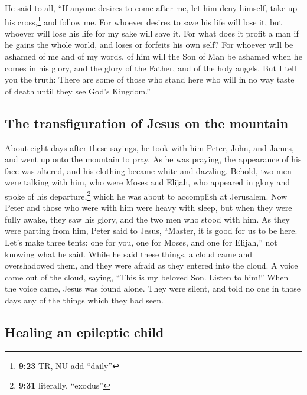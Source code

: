 He said to all, ``If anyone desires to come after me,
let him deny himself, take up his cross,\footnote{\textbf{9:23} TR, NU
  add ``daily''} and follow me.  For whoever desires to
save his life will lose it, but whoever will lose his life for my sake
will save it.  For what does it profit a man if he gains
the whole world, and loses or forfeits his own self?  For
whoever will be ashamed of me and of my words, of him will the Son of
Man be ashamed when he comes in his glory, and the glory of the Father,
and of the holy angels.  But I tell you the truth: There
are some of those who stand here who will in no way taste of death until
they see God's Kingdom.''

\hypertarget{the-transfiguration-of-jesus-on-the-mountain}{%
\subsection{The transfiguration of Jesus on the
mountain}\label{the-transfiguration-of-jesus-on-the-mountain}}

 About eight days after these sayings, he took with him
Peter, John, and James, and went up onto the mountain to pray.
 As he was praying, the appearance of his face was
altered, and his clothing became white and dazzling. 
Behold, two men were talking with him, who were Moses and Elijah,
 who appeared in glory and spoke of his
departure,\footnote{\textbf{9:31} literally, ``exodus''} which he was
about to accomplish at Jerusalem.  Now Peter and those
who were with him were heavy with sleep, but when they were fully awake,
they saw his glory, and the two men who stood with him. 
As they were parting from him, Peter said to Jesus, ``Master, it is good
for us to be here. Let's make three tents: one for you, one for Moses,
and one for Elijah,'' not knowing what he said.  While he
said these things, a cloud came and overshadowed them, and they were
afraid as they entered into the cloud.  A voice came out
of the cloud, saying, ``This is my beloved Son. Listen to him!''
 When the voice came, Jesus was found alone. They were
silent, and told no one in those days any of the things which they had
seen.

\hypertarget{healing-an-epileptic-child}{%
\subsection{Healing an epileptic
child}\label{healing-an-epileptic-child}}

